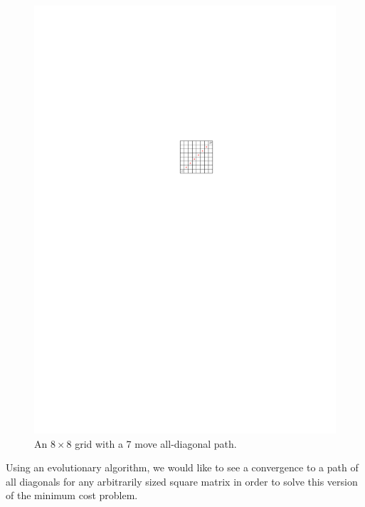 \begin{figure}[h]
    \centering
    \includegraphics[scale=2]{figures/square_grid.pdf}
    \caption{ \small An $ 8\times 8$ grid with a 7 move all-diagonal path.}
    \label{fig:square-grid}
\end{figure}

Using an evolutionary algorithm, we would like to see a convergence to a path of all diagonals for any arbitrarily sized square matrix in order to solve this version of the minimum cost problem.
